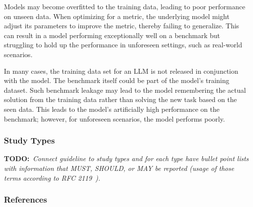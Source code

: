 \documentclass[11pt]{article}
\newcommand{\todo}[1]{{\textbf{TODO:}\ \textit{#1}}} %
\begin{document}
Models may become overfitted to the training data, leading to poor performance on unseen data.
When optimizing for a metric, the underlying model might adjust its parameters to improve the metric, thereby failing to generalize.
This can result in a model performing exceptionally well on a benchmark but struggling to hold up the performance in unforeseen settings, such as real-world scenarios.

In many cases, the training data set for an LLM is not released in conjunction with the model.
The benchmark itself could be part of the model's training dataset.
Such benchmark leakage may lead to the model remembering the actual solution from the training data rather than solving the new task based on the seen data.
This leads to the model's artificially high performance on the benchmark; however, for unforeseen scenarios, the model performs poorly.

\subsubsection{Study Types}

\todo{Connect guideline to study types and for each type have bullet point lists with information that MUST, SHOULD, or MAY be reported (usage of those terms according to RFC 2119~\cite{rfc2119}).}

\subsubsection{References}



\end{document}
